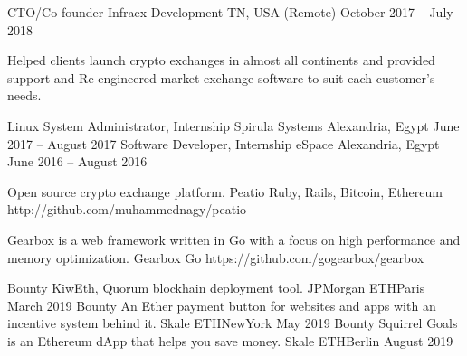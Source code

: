 \documentclass[]{awesome-cv}
\begin{document}
\begin{cventries}
{\begin{cvitems}
		\end{cvitems}}
	\cventry
	{CTO/Co-founder}
	{Infraex Development}
	{TN, USA (Remote)}
	{October 2017 – July 2018}
	{\begin{cvitems}
		\item {Helped clients launch crypto exchanges in almost all continents and provided support and Re-engineered market exchange software to suit each customer’s needs.}
		\end{cvitems}}
	\cventry
	{Linux System Administrator, Internship}
	{Spirula Systems}
	{Alexandria, Egypt}
	{June 2017 – August 2017}
	{}
	\cventry
	{Software Developer, Internship}
	{eSpace}
	{Alexandria, Egypt}
	{June 2016 – August 2016}
	{}
\end{cventries}

\vspace{-7mm}

\begin{cventries}
	\cventry
	{Open source crypto exchange platform.}
	{Peatio}
	{Ruby, Rails, Bitcoin, Ethereum}
	{http://github.com/muhammednagy/peatio}
	{}
	
	\vspace{-8mm}
	\cventry
	{Gearbox is a web framework written in Go with a focus on high performance and memory optimization.}
	{Gearbox}
	{Go}
	{https://github.com/gogearbox/gearbox}
	{}
	
	\vspace{-7mm}
\end{cventries}

\begin{cvhonors}
	\cvhonor
	{Bounty}
	{KiwEth, Quorum blockhain deployment tool.}
	{JPMorgan ETHParis}
	{March 2019}
	\cvhonor
	{Bounty}
	{An Ether payment button for websites and apps with an incentive system behind it.}
	{Skale ETHNewYork}
	{May 2019}
	\cvhonor
	{Bounty}
	{Squirrel Goals is an Ethereum dApp that helps you save money.}
	{Skale ETHBerlin}
	{August 2019}
\end{cvhonors}
\ 
\end{document}
